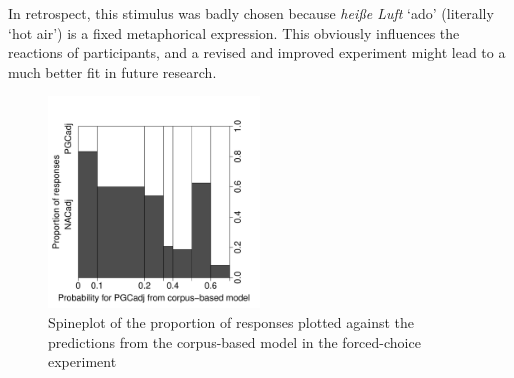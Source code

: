 \begin{exe}
\end{exe}

In retrospect, this stimulus was badly chosen because \textit{heiße Luft} `ado' (literally `hot air') is a fixed metaphorical expression.
This obviously influences the reactions of participants, and a revised and improved experiment might lead to a much better fit in future research.

\begin{figure}[htbp!]
  \centering
  \includegraphics[width=0.5\textwidth]{../R/output/fc_proportions}
  \caption{Spineplot of the proportion of responses plotted against the predictions from the corpus-based model in the forced-choice experiment}
  \label{fig:spines}
\end{figure}

